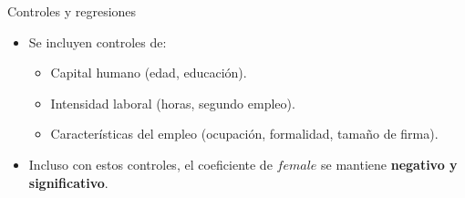 \documentclass[10pt]{beamer}
\begin{document}
\begin{frame}{Controles y regresiones}
\begin{itemize}
    \item Se incluyen controles de:
    \begin{itemize}
        \item Capital humano (edad, educación).
        \item Intensidad laboral (horas, segundo empleo).
        \item Características del empleo (ocupación, formalidad, tamaño de firma).
    \end{itemize}
    \item Incluso con estos controles, el coeficiente de $female$ se mantiene \textbf{negativo y significativo}.
\end{itemize}


\end{frame}
\end{document}
